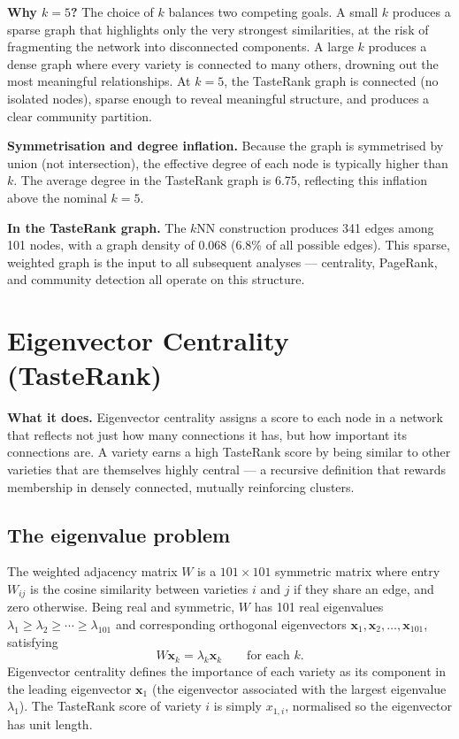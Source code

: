 \documentclass[11pt]{article}
\begin{document}
\textbf{Why $k = 5$?} The choice of $k$ balances two competing goals. A small $k$ produces a sparse graph that highlights only the very strongest similarities, at the risk of fragmenting the network into disconnected components. A large $k$ produces a dense graph where every variety is connected to many others, drowning out the most meaningful relationships. At $k = 5$, the TasteRank graph is connected (no isolated nodes), sparse enough to reveal meaningful structure, and produces a clear community partition.

\textbf{Symmetrisation and degree inflation.} Because the graph is symmetrised by union (not intersection), the effective degree of each node is typically higher than $k$. The average degree in the TasteRank graph is 6.75, reflecting this inflation above the nominal $k = 5$.

\textbf{In the TasteRank graph.} The $k$NN construction produces 341 edges among 101 nodes, with a graph density of 0.068 (6.8\% of all possible edges). This sparse, weighted graph is the input to all subsequent analyses --- centrality, PageRank, and community detection all operate on this structure.

\section{Eigenvector Centrality (TasteRank)}

\textbf{What it does.} Eigenvector centrality assigns a score to each node in a network that reflects not just how many connections it has, but how important its connections are. A variety earns a high TasteRank score by being similar to other varieties that are themselves highly central --- a recursive definition that rewards membership in densely connected, mutually reinforcing clusters.

\subsection{The eigenvalue problem}
The weighted adjacency matrix $W$ is a $101 \times 101$ symmetric matrix where entry $W_{ij}$ is the cosine similarity between varieties $i$ and $j$ if they share an edge, and zero otherwise. Being real and symmetric, $W$ has 101 real eigenvalues $\lambda_1 \geq \lambda_2 \geq \cdots \geq \lambda_{101}$ and corresponding orthogonal eigenvectors $\mathbf{x}_1, \mathbf{x}_2, \ldots, \mathbf{x}_{101}$, satisfying
\[
W \mathbf{x}_k = \lambda_k \mathbf{x}_k \qquad \text{for each } k.
\]
Eigenvector centrality defines the importance of each variety as its component in the leading eigenvector $\mathbf{x}_1$ (the eigenvector associated with the largest eigenvalue $\lambda_1$). The TasteRank score of variety $i$ is simply $x_{1,i}$, normalised so the eigenvector has unit length.
\end{document}
